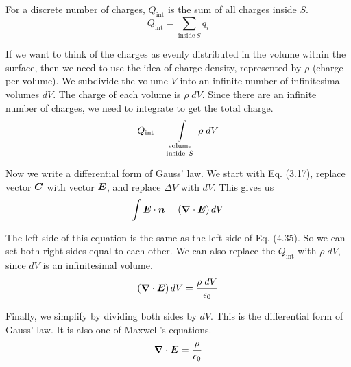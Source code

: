 For a discrete number of charges, $Q_{\mathrm{int}}$ is the 
sum of all charges inside $S$.
\begin{equation}
  Q_{\mathrm{int}} = \sum_{\mathrm{inside\ }S} q_i
\end{equation}

If we want to think of the charges as evenly distributed in the volume within the surface,
then we need to use the idea of charge density, represented by $\rho$ (charge per volume).
We subdivide the volume $V$ into an infinite number of infinitesimal volumes $dV$.
The charge of each volume is $\rho \; dV$.
Since there are an infinite number of charges, we need to integrate to get the total charge.
\begin{equation}
  Q_{\mathrm{int}} = 
  \int\limits_{\genfrac{}{}{0pt}{1}{\mathrm{volume}}{\mathrm{inside\ }S}}
  \rho \; dV
\end{equation}

Now we write a differential form of Gauss' law.
We start with Eq. (3.17), replace vector $\boldsymbol{C}$ with vector $\boldsymbol{E}$,
and replace $\Delta V$ with $dV$.  This gives us
\begin{equation*}
  \int \boldsymbol{E} \cdot \boldsymbol{n} = \left( \boldsymbol{\nabla} \cdot \boldsymbol{E} \right) dV
\end{equation*}

The left side of this equation is the same as the left side of Eq. (4.35).
So we can set both right sides equal to each other.
We can also replace the $Q_{\mathrm{int}}$ with $\rho \; dV$, 
since $dV$ is an infinitesimal volume.
\begin{equation*}
  \left( \boldsymbol{\nabla} \cdot \boldsymbol{E} \right) dV = \frac{\rho \; dV}{\epsilon_0}
\end{equation*}

Finally, we simplify by dividing both sides by $dV$.
This is the differential form of Gauss' law.
It is also one of Maxwell's equations.
\begin{equation}
  \boldsymbol{\nabla} \cdot \boldsymbol{E} = \frac{\rho}{\epsilon_0}
\end{equation}

